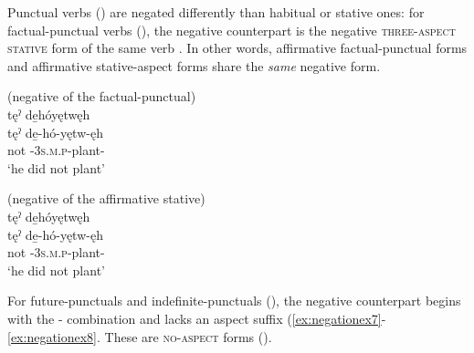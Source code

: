 Punctual verbs () are negated differently than habitual or stative ones: for factual-punctual verbs (), the negative counterpart is the negative \textsc{three-aspect stative} form of the same verb . In other words, affirmative factual-punctual forms  and affirmative stative-aspect forms  share the \emph{same} negative form.

\newpage
\ea\label{ex:negationex6}  (negative of the factual-punctual)\\
\glll tęˀ de̱hóyętwęh  \\
tęˀ de̱-hó-yętw-ęh\\
not {\negative}-\textsc{3s.m.p}-plant-{\stative}\\
\glt ‘he did not plant’
\z


\ea\label{ex:negationex600}  (negative of the affirmative stative)\\
\glll tęˀ de̱hóyętwęh  \\
tęˀ de̱-hó-yętw-ęh\\
not {\negative}-\textsc{3s.m.p}-plant-{\stative}\\
\glt ‘he did not plant’
\z



For future-punctuals and indefinite-punctuals (), the negative counterpart begins with the  \textsc{\contrastive-\indefinite} combination and lacks an aspect suffix (\ref{ex:negationex7}-\ref{ex:negationex8}. These are \textsc{no-aspect} forms ().

